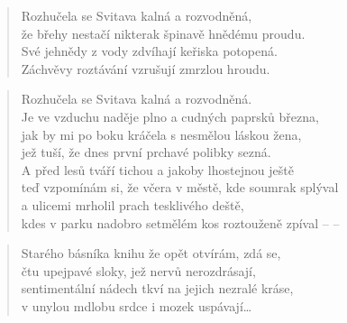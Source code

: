 \documentclass{book}
\begin{document}
\newpage
{}
\begin{verse}
Rozhučela se Svitava kalná a rozvodněná,\\
že břehy nestačí nikterak špinavě hnědému proudu.\\
Své jehnědy z vody zdvíhají keřiska potopená.\\
Záchvěvy roztávání vzrušují zmrzlou hroudu.
\end{verse}
\begin{verse}
Rozhučela se Svitava kalná a rozvodněná.\\
Je ve vzduchu naděje plno a cudných paprsků března,\\
jak by mi po boku kráčela s nesmělou láskou žena,\\
jež tuší, že dnes první prchavé polibky sezná.\\
A před lesů tváří tichou a jakoby lhostejnou ještě\\
teď vzpomínám si, že včera v městě, kde soumrak splýval\\
a ulicemi mrholil prach tesklivého deště,\\
kdes v parku nadobro setmělém kos roztouženě zpíval -- --
\end{verse}
\begin{verse}
Starého básníka knihu že opět otvírám, zdá se,\\
čtu upejpavé sloky, jež nervů nerozdrásají,\\
sentimentální nádech tkví na jejich nezralé kráse,\\
v unylou mdlobu srdce i mozek uspávají\ldots
\end{verse}
\end{document}
